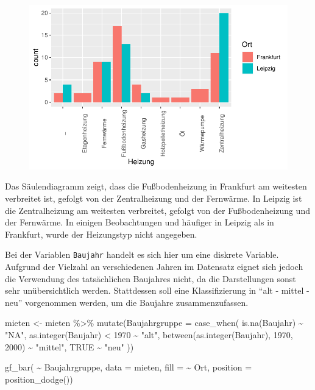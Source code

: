 \documentclass[
  a4paper,
  DIV=11]{scrartcl}
\newenvironment{Shaded}{\begin{snugshade}}{\end{snugshade}}
\newcommand{\AttributeTok}[1]{\textcolor[rgb]{0.40,0.45,0.13}{#1}}
\newcommand{\ConstantTok}[1]{\textcolor[rgb]{0.56,0.35,0.01}{#1}}
\newcommand{\DecValTok}[1]{\textcolor[rgb]{0.68,0.00,0.00}{#1}}
\newcommand{\FunctionTok}[1]{\textcolor[rgb]{0.28,0.35,0.67}{#1}}
\newcommand{\NormalTok}[1]{\textcolor[rgb]{0.00,0.23,0.31}{#1}}
\newcommand{\OtherTok}[1]{\textcolor[rgb]{0.00,0.23,0.31}{#1}}
\newcommand{\SpecialCharTok}[1]{\textcolor[rgb]{0.37,0.37,0.37}{#1}}
\newcommand{\StringTok}[1]{\textcolor[rgb]{0.13,0.47,0.30}{#1}}
\begin{document}
\begin{figure}[H]

{\centering \includegraphics{Mietmodellierung_files/figure-pdf/unnamed-chunk-10-1.pdf}

}

\end{figure}

Das Säulendiagramm zeigt, dass die Fußbodenheizung in Frankfurt am
weitesten verbreitet ist, gefolgt von der Zentralheizung und der
Fernwärme. In Leipzig ist die Zentralheizung am weitesten verbreitet,
gefolgt von der Fußbodenheizung und der Fernwärme. In einigen
Beobachtungen und häufiger in Leipzig als in Frankfurt, wurde der
Heizungstyp nicht angegeben.

Bei der Variablen \texttt{Baujahr} handelt es sich hier um eine diskrete
Variable. Aufgrund der Vielzahl an verschiedenen Jahren im Datensatz
eignet sich jedoch die Verwendung des tatsächlichen Baujahres nicht, da
die Darstellungen sonst sehr unübersichtlich werden. Stattdessen soll
eine Klassifizierung in ``alt - mittel - neu'' vorgenommen werden, um
die Baujahre zusammenzufassen.

\begin{Shaded}
\begin{Highlighting}[]
\NormalTok{mieten }\OtherTok{\textless{}{-}}\NormalTok{ mieten }\SpecialCharTok{\%\textgreater{}\%}
  \FunctionTok{mutate}\NormalTok{(}\AttributeTok{Baujahrgruppe =} \FunctionTok{case\_when}\NormalTok{(}
    \FunctionTok{is.na}\NormalTok{(Baujahr) }\SpecialCharTok{\textasciitilde{}} \StringTok{"NA"}\NormalTok{,}
    \FunctionTok{as.integer}\NormalTok{(Baujahr) }\SpecialCharTok{\textless{}} \DecValTok{1970} \SpecialCharTok{\textasciitilde{}} \StringTok{"alt"}\NormalTok{,}
    \FunctionTok{between}\NormalTok{(}\FunctionTok{as.integer}\NormalTok{(Baujahr), }\DecValTok{1970}\NormalTok{, }\DecValTok{2000}\NormalTok{) }\SpecialCharTok{\textasciitilde{}} \StringTok{"mittel"}\NormalTok{,}
    \ConstantTok{TRUE} \SpecialCharTok{\textasciitilde{}} \StringTok{"neu"}
\NormalTok{  ))}

\FunctionTok{gf\_bar}\NormalTok{( }\SpecialCharTok{\textasciitilde{}}\NormalTok{ Baujahrgruppe, }\AttributeTok{data =}\NormalTok{ mieten, }\AttributeTok{fill =} \SpecialCharTok{\textasciitilde{}}\NormalTok{ Ort, }\AttributeTok{position =} \FunctionTok{position\_dodge}\NormalTok{())}
\end{Highlighting}
\end{Shaded}
\end{document}
